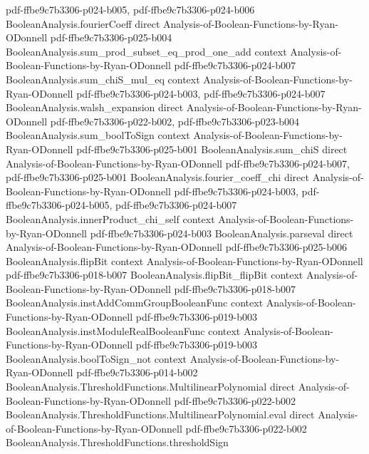 \begin{lemma}
  {pdf-ffbe9c7b3306-p024-b005,
    pdf-ffbe9c7b3306-p024-b006}
\proofstep
  {BooleanAnalysis.fourierCoeff}
  {direct}
  {Analysis-of-Boolean-Functions-by-Ryan-ODonnell}
  {pdf-ffbe9c7b3306-p025-b004}
\proofstep
  {BooleanAnalysis.sum_prod_subset_eq_prod_one_add}
  {context}
  {Analysis-of-Boolean-Functions-by-Ryan-ODonnell}
  {pdf-ffbe9c7b3306-p024-b007}
\proofstep
  {BooleanAnalysis.sum_chiS_mul_eq}
  {context}
  {Analysis-of-Boolean-Functions-by-Ryan-ODonnell}
  {pdf-ffbe9c7b3306-p024-b003,
    pdf-ffbe9c7b3306-p024-b007}
\proofstep
  {BooleanAnalysis.walsh_expansion}
  {direct}
  {Analysis-of-Boolean-Functions-by-Ryan-ODonnell}
  {pdf-ffbe9c7b3306-p022-b002,
    pdf-ffbe9c7b3306-p023-b004}
\proofstep
  {BooleanAnalysis.sum_boolToSign}
  {context}
  {Analysis-of-Boolean-Functions-by-Ryan-ODonnell}
  {pdf-ffbe9c7b3306-p025-b001}
\proofstep
  {BooleanAnalysis.sum_chiS}
  {direct}
  {Analysis-of-Boolean-Functions-by-Ryan-ODonnell}
  {pdf-ffbe9c7b3306-p024-b007,
    pdf-ffbe9c7b3306-p025-b001}
\proofstep
  {BooleanAnalysis.fourier_coeff_chi}
  {direct}
  {Analysis-of-Boolean-Functions-by-Ryan-ODonnell}
  {pdf-ffbe9c7b3306-p024-b003,
    pdf-ffbe9c7b3306-p024-b005,
    pdf-ffbe9c7b3306-p024-b007}
\proofstep
  {BooleanAnalysis.innerProduct_chi_self}
  {context}
  {Analysis-of-Boolean-Functions-by-Ryan-ODonnell}
  {pdf-ffbe9c7b3306-p024-b003}
\proofstep
  {BooleanAnalysis.parseval}
  {direct}
  {Analysis-of-Boolean-Functions-by-Ryan-ODonnell}
  {pdf-ffbe9c7b3306-p025-b006}
\proofstep
  {BooleanAnalysis.flipBit}
  {context}
  {Analysis-of-Boolean-Functions-by-Ryan-ODonnell}
  {pdf-ffbe9c7b3306-p018-b007}
\proofstep
  {BooleanAnalysis.flipBit_flipBit}
  {context}
  {Analysis-of-Boolean-Functions-by-Ryan-ODonnell}
  {pdf-ffbe9c7b3306-p018-b007}
\proofstep
  {BooleanAnalysis.instAddCommGroupBooleanFunc}
  {context}
  {Analysis-of-Boolean-Functions-by-Ryan-ODonnell}
  {pdf-ffbe9c7b3306-p019-b003}
\proofstep
  {BooleanAnalysis.instModuleRealBooleanFunc}
  {context}
  {Analysis-of-Boolean-Functions-by-Ryan-ODonnell}
  {pdf-ffbe9c7b3306-p019-b003}
\proofstep
  {BooleanAnalysis.boolToSign_not}
  {context}
  {Analysis-of-Boolean-Functions-by-Ryan-ODonnell}
  {pdf-ffbe9c7b3306-p014-b002}
\proofstep
  {BooleanAnalysis.ThresholdFunctions.MultilinearPolynomial}
  {direct}
  {Analysis-of-Boolean-Functions-by-Ryan-ODonnell}
  {pdf-ffbe9c7b3306-p022-b002}
\proofstep
  {BooleanAnalysis.ThresholdFunctions.MultilinearPolynomial.eval}
  {direct}
  {Analysis-of-Boolean-Functions-by-Ryan-ODonnell}
  {pdf-ffbe9c7b3306-p022-b002}
\proofstep
  {BooleanAnalysis.ThresholdFunctions.thresholdSign}

\end{lemma}
